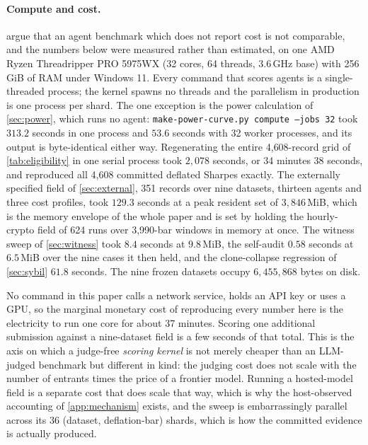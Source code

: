 \paragraph{Compute and cost.}  argue that an agent benchmark which does not report cost is not comparable, and the numbers below were measured rather than estimated, on one AMD Ryzen Threadripper PRO 5975WX (32 cores, 64 threads, 3.6\,GHz base) with 256\,GiB of RAM under Windows 11. Every command that scores agents is a single-threaded process; the kernel spawns no threads and the parallelism in production is one process per shard. The one exception is the power calculation of \cref{sec:power}, which runs no agent: \texttt{make-power-curve.py compute --jobs 32} took $313.2$ seconds in one process and $53.6$ seconds with 32 worker processes, and its output is byte-identical either way. Regenerating the entire 4{,}608-record grid of \cref{tab:eligibility} in one serial process took $2{,}078$ seconds, or 34 minutes 38 seconds, and reproduced all 4{,}608 committed deflated Sharpes exactly. The externally specified field of \cref{sec:external}, 351 records over nine datasets, thirteen agents and three cost profiles, took $129.3$ seconds at a peak resident set of $3{,}846$\,MiB, which is the memory envelope of the whole paper and is set by holding the hourly-crypto field of 624 runs over 3{,}990-bar windows in memory at once. The witness sweep of \cref{sec:witness} took $8.4$ seconds at $9.8$\,MiB, the self-audit $0.58$ seconds at $6.5$\,MiB over the nine cases it then held, and the clone-collapse regression of \cref{sec:sybil} $61.8$ seconds. The nine frozen datasets occupy $6{,}455{,}868$ bytes on disk.

No command in this paper calls a network service, holds an API key or uses a GPU, so the marginal monetary cost of reproducing every number here is the electricity to run one core for about 37 minutes. Scoring one additional submission against a nine-dataset field is a few seconds of that total. This is the axis on which a judge-free \emph{scoring kernel} is not merely cheaper than an LLM-judged benchmark but different in kind: the judging cost does not scale with the number of entrants times the price of a frontier model. Running a hosted-model field is a separate cost that does scale that way, which is why the host-observed accounting of \cref{app:mechanism} exists, and the sweep is embarrassingly parallel across its 36 (dataset, deflation-bar) shards, which is how the committed evidence is actually produced.

